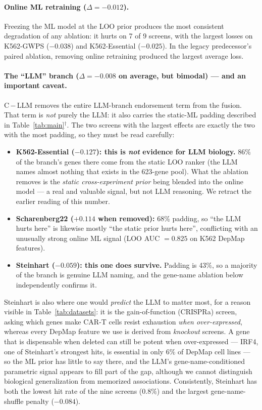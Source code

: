 \documentclass[11pt]{article}
\begin{document}
\paragraph{Online ML retraining ($\Delta = -0.012$).}
Freezing the ML model at the LOO prior produces the most consistent degradation of any ablation:
it hurts on 7 of 9 screens, with the largest losses on K562-GWPS ($-0.038$) and
K562-Essential ($-0.025$).
In the legacy predecessor's paired ablation, removing online retraining produced the largest average loss.

\paragraph{The ``LLM'' branch ($\Delta = -0.008$ on average, but bimodal) --- and an important caveat.}
C\,$-$\,LLM removes the entire LLM-branch endorsement term from the fusion. That term is \emph{not}
purely the LLM: it also carries the static-ML padding described in Table~\ref{tab:main}$^\dagger$.
The two screens with the largest effects are exactly the two with the most padding, so they must be
read carefully:
\begin{itemize}\itemsep2pt
  \item \textbf{K562-Essential ($-0.127$): this is \emph{not} evidence for LLM biology.} 86\% of the
  branch's genes there come from the static LOO ranker (the LLM names almost nothing that exists in
  the 623-gene pool). What the ablation removes is the \emph{static cross-experiment prior} being
  blended into the online model --- a real and valuable signal, but not LLM reasoning. We retract the
  earlier reading of this number.
  \item \textbf{Scharenberg22 ($+0.114$ when removed):} 68\% padding, so ``the LLM hurts here'' is
  likewise mostly ``the static prior hurts here'', conflicting with an unusually strong online ML
  signal (LOO AUC $=0.825$ on K562 DepMap features).
  \item \textbf{Steinhart ($-0.059$): this one does survive.} Padding is 43\%, so a majority of the
  branch is genuine LLM naming, and the gene-name ablation below independently confirms it.
\end{itemize}

\noindent
Steinhart is also where one would \emph{predict} the LLM to matter most, for a reason visible in
Table~\ref{tab:datasets}: it is the gain-of-function (CRISPRa) screen, asking which genes make CAR-T
cells resist exhaustion \emph{when over-expressed}, whereas every DepMap feature we use is derived
from \emph{knockout} screens. A gene that is dispensable when deleted can still be potent when
over-expressed --- IRF4, one of Steinhart's strongest hits, is essential in only 6\% of DepMap cell
lines --- so the ML prior has little to say there, and the LLM's gene-name-conditioned parametric signal
appears to fill part of the gap, although we cannot distinguish biological generalization from memorized
associations. Consistently, Steinhart has both the lowest hit rate of the nine screens (0.8\%) and the
largest gene-name-shuffle penalty ($-0.084$).
\end{document}
